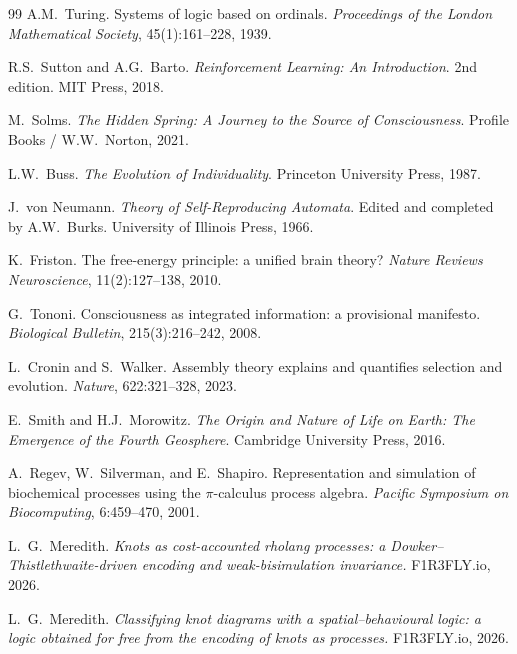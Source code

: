 \begin{thebibliography}{99}
A.M.~Turing. \newblock Systems of logic based on ordinals. \newblock \emph{Proceedings of the London Mathematical Society}, 45(1):161--228, 1939.

R.S.~Sutton and A.G.~Barto. \newblock \emph{Reinforcement Learning: An Introduction}. \newblock 2nd edition. MIT Press, 2018.

M.~Solms. \newblock \emph{The Hidden Spring: A Journey to the Source of Consciousness}. \newblock Profile Books / W.W.~Norton, 2021.

L.W.~Buss. \newblock \emph{The Evolution of Individuality}. \newblock Princeton University Press, 1987.

J.~von Neumann. \newblock \emph{Theory of Self-Reproducing Automata}. \newblock Edited and completed by A.W.~Burks. \newblock University of Illinois Press, 1966.

K.~Friston. \newblock The free-energy principle: a unified brain theory? \newblock \emph{Nature Reviews Neuroscience}, 11(2):127--138, 2010.

G.~Tononi. \newblock Consciousness as integrated information: a provisional manifesto. \newblock \emph{Biological Bulletin}, 215(3):216--242, 2008. %

L.~Cronin and S.~Walker. \newblock Assembly theory explains and quantifies selection and evolution. \newblock \emph{Nature}, 622:321--328, 2023.

E.~Smith and H.J.~Morowitz. \newblock \emph{The Origin and Nature of Life on Earth: The Emergence of the Fourth Geosphere}. \newblock Cambridge University Press, 2016.

A.~Regev, W.~Silverman, and E.~Shapiro. \newblock Representation and simulation of biochemical processes using the $\pi$-calculus process algebra. \newblock \emph{Pacific Symposium on Biocomputing}, 6:459--470, 2001.

L.\ G.\ Meredith. \emph{Knots as cost-accounted rholang processes: a Dowker--Thistlethwaite-driven encoding and weak-bisimulation invariance.} F1R3FLY.io, 2026.

L.\ G.\ Meredith. \emph{Classifying knot diagrams with a spatial--behavioural logic: a logic obtained for free from the encoding of knots as processes.} F1R3FLY.io, 2026.


\end{thebibliography}
